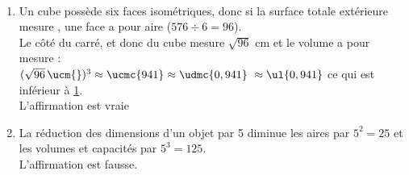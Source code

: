 \ \\ [-5mm]
   \begin{enumerate}
      \item Un cube possède six faces isométriques, donc si la surface totale extérieure mesure , une face a pour aire  ($576\div6 =96$). \\
         Le côté du carré, et donc du cube mesure $\sqrt{96}$ cm et le volume a pour mesure : \\
         $(\sqrt{96}\,\ucm{})^3 \approx \ucmc{941} \approx \udmc{0,941} \        \approx \ul{0,941}$ ce qui est inférieur à \ul{1}. \\
         {\blue L'affirmation est vraie} \\
      \item La réduction des dimensions d'un objet par 5 diminue les aires par $5^2 =25$ et les volumes et capacités par $5^3 =125$. \\
         {\blue L'affirmation est fausse.}
   \end{enumerate}
